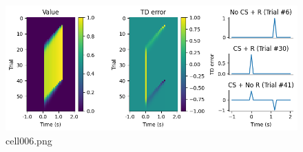 \begin{figure}[ht]
	\centering
	\includegraphics[scale=0.8, max width=\linewidth]{./fig/reinforcement-learning/td-learning/cell006.png}
	\caption{cell006.png}
	\label{cell006.png}
\end{figure}
